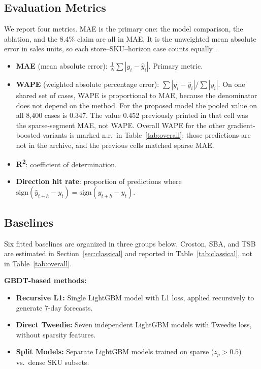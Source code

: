 \documentclass[review,authoryear]{elsarticle}
\begin{document}
\subsection{Evaluation Metrics}
\label{sec:metrics}

We report four metrics. MAE is the primary one: the model comparison, the ablation, and the 8.4\% claim are all in MAE. It is the unweighted mean absolute error in sales units, so each store--SKU--horizon case counts equally \citep{hyndman2006accuracy}.

\begin{itemize}
    \item \textbf{MAE} (mean absolute error): $\frac{1}{N}\sum |y_i - \hat{y}_i|$. Primary metric.
    \item \textbf{WAPE} (weighted absolute percentage error): $\sum|y_i - \hat{y}_i| / \sum|y_i|$. On one shared set of cases, WAPE is proportional to MAE, because the denominator does not depend on the method. For the proposed model the pooled value on all 8{,}400 cases is 0.347. The value 0.452 previously printed in that cell was the sparse-segment MAE, not WAPE. Overall WAPE for the other gradient-boosted variants is marked n.r.\ in Table~\ref{tab:overall}: those predictions are not in the archive, and the previous cells matched sparse MAE.
    \item \textbf{R\textsuperscript{2}}: coefficient of determination.
    \item \textbf{Direction hit rate}: proportion of predictions where $\text{sign}(\hat{y}_{t+h} - y_t) = \text{sign}(y_{t+h} - y_t)$.
\end{itemize}

\subsection{Baselines}

Six fitted baselines are organized in three groups below. Croston, SBA, and TSB are estimated in Section~\ref{sec:classical} and reported in Table~\ref{tab:classical}, not in Table~\ref{tab:overall}.

\textbf{GBDT-based methods:}
\begin{itemize}
    \item \textbf{Recursive L1:} Single LightGBM model with L1 loss, applied recursively to generate 7-day forecasts.
    \item \textbf{Direct Tweedie:} Seven independent LightGBM models with Tweedie loss, without sparsity features.
    \item \textbf{Split Models:} Separate LightGBM models trained on sparse ($z_p > 0.5$) vs.\ dense SKU subsets.
\end{itemize}
\end{document}
